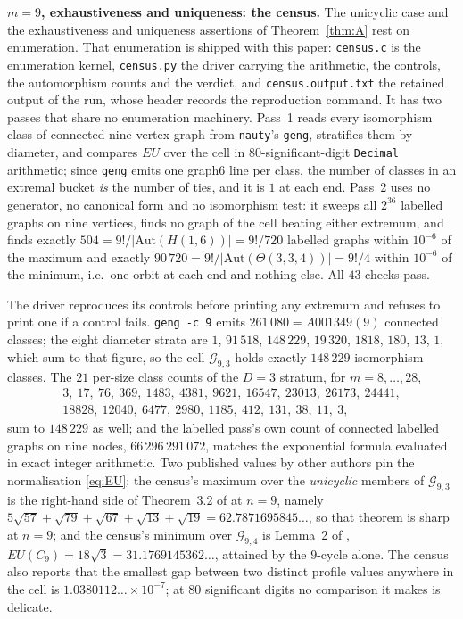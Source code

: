 \documentclass[11pt]{amsart}
\theoremstyle{remark}
\newcommand{\EU}{\mathit{EU}}
\newcommand{\Gnd}{\mathcal G}
\begin{document}
\medskip
\noindent\textbf{$m=9$, exhaustiveness and uniqueness: the census.} The
unicyclic case and the exhaustiveness and uniqueness assertions of
Theorem~\ref{thm:A} rest on enumeration. That enumeration is shipped with this
paper: \texttt{census.c} is the enumeration kernel, \texttt{census.py} the
driver carrying the arithmetic, the controls, the automorphism counts and the
verdict, and \texttt{census.output.txt} the retained output of the run, whose
header records the reproduction command. It has two passes that share no
enumeration machinery. Pass~1 reads every isomorphism class of connected
nine-vertex graph from \texttt{nauty}'s \texttt{geng}, stratifies them by
diameter, and compares $\EU$ over the cell in $80$-significant-digit
\texttt{Decimal} arithmetic; since \texttt{geng} emits one graph6 line per
class, the number of classes in an extremal bucket \emph{is} the number of
ties, and it is $1$ at each end. Pass~2 uses no generator, no canonical form
and no isomorphism test: it sweeps all $2^{36}$ labelled graphs on nine
vertices, finds no graph of the cell beating either extremum, and finds exactly
$504=9!/|\mathrm{Aut}(H(1,6))|=9!/720$ labelled graphs within $10^{-6}$ of the
maximum and exactly $90\,720=9!/|\mathrm{Aut}(\Theta(3,3,4))|=9!/4$ within
$10^{-6}$ of the minimum, i.e.\ one orbit at each end and nothing else. All
$43$ checks pass.

The driver reproduces its controls before printing any extremum and refuses to
print one if a control fails. \texttt{geng -c 9} emits
$261\,080=A001349(9)$ connected classes; the eight diameter strata are
$1$, $91\,518$, $148\,229$, $19\,320$, $1818$, $180$, $13$, $1$, which sum to
that figure, so the cell
$\Gnd_{9,3}$ holds exactly $148\,229$ isomorphism classes. The $21$ per-size
class counts of the $D=3$ stratum, for $m=8,\ldots,28$,
\[
 \begin{gathered}
 3,\ 17,\ 76,\ 369,\ 1483,\ 4381,\ 9621,\ 16547,\ 23013,\ 26173,\ 24441,\\
 18828,\ 12040,\ 6477,\ 2980,\ 1185,\ 412,\ 131,\ 38,\ 11,\ 3,
 \end{gathered}
\]
sum to $148\,229$ as well; and the labelled pass's own count of connected
labelled graphs on nine nodes, $66\,296\,291\,072$, matches the exponential
formula evaluated in exact integer arithmetic. Two published values by other
authors pin the normalisation \eqref{eq:EU}: the census's maximum over the
\emph{unicyclic} members of $\Gnd_{9,3}$ is the right-hand side of Theorem~3.2
of \cite{Sekar} at $n=9$, namely
$5\sqrt{57}+\sqrt{79}+\sqrt{67}+\sqrt{13}+\sqrt{19}=62.7871695845\ldots$, so
that theorem is sharp at $n=9$; and the census's minimum over $\Gnd_{9,4}$ is
Lemma~2 of \cite{Kizilirmak}, $\EU(C_9)=18\sqrt3=31.1769145362\ldots$,
attained by the $9$-cycle alone. The census also reports that the smallest gap
between two distinct profile values anywhere in the cell is
$1.0380112\ldots\times10^{-7}$; at $80$ significant digits no comparison it
makes is delicate.
\end{document}
